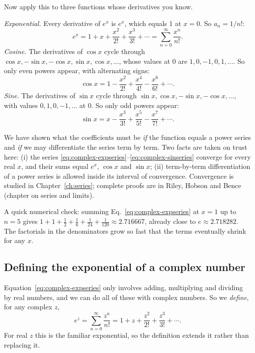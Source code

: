 Now apply this to three functions whose derivatives you know.

\emph{Exponential.} Every derivative of $e^x$ is $e^x$, which equals 1 at $x=0$. So $a_n=1/n!$:
\begin{equation}
e^x=1+x+\frac{x^2}{2!}+\frac{x^3}{3!}+\cdots=\sum_{n=0}^{\infty}\frac{x^n}{n!}.\label{eq:complex-expseries}
\end{equation}
\emph{Cosine.} The derivatives of $\cos x$ cycle through $\cos x,-\sin x,-\cos x,\sin x,\cos x,\dots$, whose values at 0 are $1,0,-1,0,1,\dots$. So only even powers appear, with alternating signs:
\begin{equation}
\cos x=1-\frac{x^2}{2!}+\frac{x^4}{4!}-\frac{x^6}{6!}+\cdots .\label{eq:complex-cosseries}
\end{equation}
\emph{Sine.} The derivatives of $\sin x$ cycle through $\sin x,\cos x,-\sin x,-\cos x,\dots$, with values $0,1,0,-1,\dots$ at 0. So only odd powers appear:
\begin{equation}
\sin x=x-\frac{x^3}{3!}+\frac{x^5}{5!}-\frac{x^7}{7!}+\cdots .\label{eq:complex-sinseries}
\end{equation}

\begin{beyond}
We have shown what the coefficients must be \emph{if} the function equals a power series and \emph{if} we may differentiate the series term by term. Two facts are taken on trust here: (i) the series \eqref{eq:complex-expseries}--\eqref{eq:complex-sinseries} converge for every real $x$, and their sums equal $e^x$, $\cos x$ and $\sin x$; (ii) term-by-term differentiation of a power series is allowed inside its interval of convergence. Convergence is studied in Chapter~\ref{ch:series}; complete proofs are in Riley, Hobson and Bence~\cite{rhb} (chapter on series and limits).
\end{beyond}

A quick numerical check: summing Eq.~\eqref{eq:complex-expseries} at $x=1$ up to $n=5$ gives $1+1+\tfrac12+\tfrac16+\tfrac1{24}+\tfrac1{120}\approx2.716667$, already close to $e\approx2.718282$. The factorials in the denominators grow so fast that the terms eventually shrink for any $x$.

\subsection{Defining the exponential of a complex number}

Equation~\eqref{eq:complex-expseries} only involves adding, multiplying and dividing by real numbers, and we can do all of these with complex numbers. So we \emph{define}, for any complex $z$,
\begin{equation}
e^{z}=\sum_{n=0}^{\infty}\frac{z^n}{n!}=1+z+\frac{z^2}{2!}+\frac{z^3}{3!}+\cdots .\label{eq:complex-expdef}
\end{equation}
For real $z$ this is the familiar exponential, so the definition extends it rather than replacing it.

